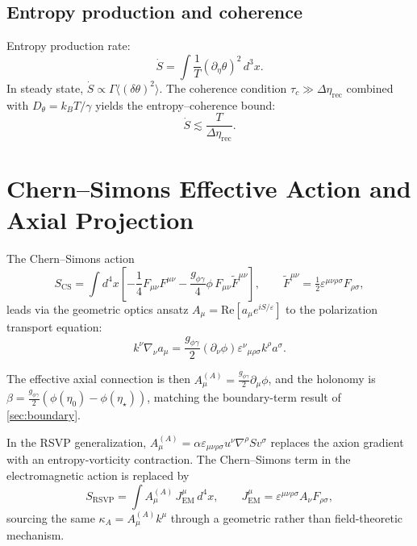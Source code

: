 \documentclass[12pt]{article}
\theoremstyle{definition}
\newcommand{\kA}{\kappa_A}
\newcommand{\Wrec}{\Delta\eta_{\mathrm{rec}}}
\newcommand{\etastar}{\eta_\star}
\newcommand{\gpg}{g_{\phi\gamma}}
\begin{document}
\subsection{Entropy production and coherence}

Entropy production rate:
\begin{equation}
  \dot{S} = \int\frac{1}{T}(\partial_\eta\theta)^2\,d^3x.
\end{equation}
In steady state, $\dot{S}\propto\Gamma\langle(\delta\theta)^2\rangle$.
The coherence condition $\tau_c\gg\Wrec$ combined with
$D_\theta=k_BT/\gamma$ yields the entropy--coherence bound:
\begin{equation}
  \dot{S}\lesssim\frac{T}{\Wrec}.
\end{equation}

\section{Chern--Simons Effective Action and Axial Projection}
\label{app:CS}

The Chern--Simons action
\begin{equation}
  S_{\mathrm{CS}}
  = \int d^4x\left[
    -\frac{1}{4}F_{\mu\nu}F^{\mu\nu}
    -\frac{\gpg}{4}\phi\,F_{\mu\nu}\widetilde{F}^{\mu\nu}
  \right],
  \qquad
  \widetilde{F}^{\mu\nu}=\tfrac{1}{2}\varepsilon^{\mu\nu\rho\sigma}F_{\rho\sigma},
\end{equation}
leads via the geometric optics ansatz $A_\mu=\mathrm{Re}[a_\mu e^{iS/\varepsilon}]$
to the polarization transport equation:
\begin{equation}
  k^\nu\nabla_\nu a_\mu
  = \frac{\gpg}{2}(\partial_\nu\phi)\varepsilon^\nu{}_{\mu\rho\sigma}k^\rho a^\sigma.
\end{equation}

The effective axial connection is then $A_\mu^{(A)}=\tfrac{\gpg}{2}\partial_\mu\phi$,
and the holonomy is $\beta=\tfrac{\gpg}{2}(\phi(\eta_0)-\phi(\etastar))$,
matching the boundary-term result of \cref{sec:boundary}.

In the RSVP generalization, $A_\mu^{(A)}=\alpha\varepsilon_{\mu\nu\rho\sigma}
u^\nu\nabla^\rho Sv^\sigma$ replaces the axion gradient with an entropy-vorticity
contraction. The Chern--Simons term in the electromagnetic action is replaced by
\begin{equation}
  S_{\mathrm{RSVP}}
  = \int A_\mu^{(A)}\,J^\mu_{\mathrm{EM}}\,d^4x,
  \qquad
  J^\mu_{\mathrm{EM}}=\varepsilon^{\mu\nu\rho\sigma}A_\nu F_{\rho\sigma},
\end{equation}
sourcing the same $\kA=A_\mu^{(A)}k^\mu$ through a geometric rather than
field-theoretic mechanism.
\end{document}
